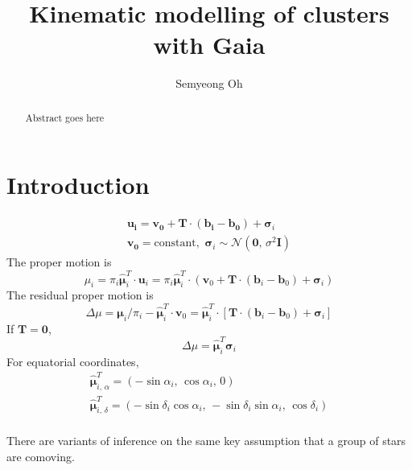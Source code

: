 \documentclass[modern,manuscript]{aastex61}
\newcommand{\normal}{{\mathcal{N}}}
\newcommand{\bs}[1]{\boldsymbol{#1}}
\newcommand{\mat}[1]{\mathbf{#1}}
\renewcommand{\vec}[1]{\bs{#1}}
\begin{document}
\sloppy\sloppypar\raggedbottom\frenchspacing %


\title{ Kinematic modelling of clusters with Gaia }

\author{
  Semyeong Oh
}

\begin{abstract}
  Abstract goes here
\end{abstract}

\section{Introduction}
\label{sec:introduction}




\begin{equation}
  \begin{split}
    \vec{u_i} = \vec{v_0} + \mat{T} \cdot (\vec{b_i}-\vec{b_0}) + \vec{\sigma}_i \\
    \vec{v_0} = \mathrm{constant},\,\, \vec{\sigma}_i \sim \normal(\vec{0},\,\sigma^2\mat{I})
  \end{split}
\end{equation}
The proper motion is
\begin{equation}
  \mu_i = \pi_i \vec{\hat\mu}_i^T \cdot \vec{u}_i
    = \pi_i \vec{\hat\mu}_i^T \cdot \left(\vec{v}_0 + \mat{T}\cdot(\vec{b}_i-\vec{b}_0)+\vec{\sigma}_i\right)
\end{equation}
The residual proper motion is
\begin{equation}
  \Delta{\mu} = \vec{\mu}_i/\pi_i - \vec{\hat\mu}_i^T \cdot \vec{v}_0 =
    \vec{\hat\mu}_i^T \cdot \left[ \mat{T}\cdot(\vec{b}_i-\vec{b}_0) + \vec{\sigma}_i\right]
\end{equation}
If $\mat{T}=\mat{0}$,
\begin{equation}
  \Delta\mu = \vec{\hat\mu}_i^T \vec{\sigma}_i
\end{equation}
For equatorial coordinates,
\begin{equation}
  \begin{split}
    \vec{\hat\mu}_{i,\,\alpha}^T = (-\sin\alpha_i,\,\cos\alpha_i,\,0) \\
    \vec{\hat\mu}_{i,\,\delta}^T = (-\sin\delta_i \cos\alpha_i,\,-\sin\delta_i \sin\alpha_i,\,\cos\delta_i) \\
  \end{split}
\end{equation}


There are variants of inference on the same key assumption that
a group of stars are comoving.
\end{document}
